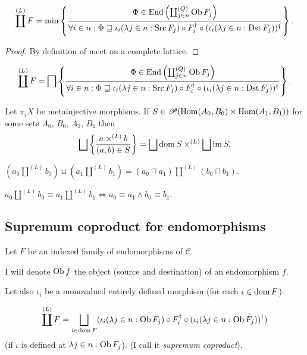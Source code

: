 \begin{prop}
  \[ \coprod^{(L)} F = \min \left\{ \frac{ \Phi \in \operatorname{End} \left( \coprod^{(Q)}_{j
  \in n} \operatorname{Ob} F_j \right) }{ \forall i \in n :
  \Phi \sqsupseteq \iota_i(\lambda j \in n : \operatorname{Src} F_j) \circ
  F_i^{\dagger} \circ (\iota_i(\lambda j \in n : \operatorname{Dst} F_j))^{\dagger} }\right\}. \]
\end{prop}

\begin{proof}
  By definition of meet on a complete lattice.
\end{proof}

\begin{cor}
  \[ \coprod^{(L)} F = \bigsqcap \left\{ \frac{ \Phi \in \operatorname{End} \left(
  \coprod^{(Q)}_{j \in n} \operatorname{Ob} F_j \right) }{
  \forall i \in n : \Phi \sqsupseteq \iota_i(\lambda j \in n : \operatorname{Src}
  F_j) \circ F_i^{\dagger} \circ (\iota_i(\lambda j \in n : \operatorname{Dst}
  F_j))^{\dagger} }\right\}. \]
\end{cor}

\begin{thm}
  Let $\pi_i X$ be metainjective morphisms. If $S \in \mathscr{P} (\operatorname{Hom}
  (A_0 , B_0) \times \operatorname{Hom} (A_1 , B_1))$ for some sets $A_0$, $B_0$,
  $A_1$, $B_1$ then
  \[ \bigsqcup \setcond{ a \times^{(L)} b }{ (a , b)
     \in S } = \bigsqcup \dom S \times^{(L)} \bigsqcup \im
     S. \]
\end{thm}

\begin{cor}
  $(a_0 \amalg^{(L)} b_0) \sqcup (a_1 \amalg^{(L)} b_1) = (a_0 \sqcap a_1)
  \amalg^{(L)} (b_0 \sqcap b_1)$.
\end{cor}

\begin{cor}
  $a_0 \amalg^{(L)} b_0 \equiv a_1 \amalg^{(L)} b_1 \Leftrightarrow a_0 \equiv
  a_1 \wedge b_0 \equiv b_1$.
\end{cor}

\subsection{Supremum coproduct for endomorphisms}

Let $F$ be an indexed family of endomorphisms of $\mathcal{C}$.

I will denote $\operatorname{Ob} f$ the object (source and destination) of an
endomorphism $f$.

Let also $\iota_i$ be a monovalued entirely defined morphism (for each $i \in
\operatorname{dom} F$).

\begin{defn}
  \[ \coprod^{(L)} F = \bigsqcup_{i \in \dom F} (\iota_i(\lambda j \in n :
  \Ob F_j) \circ F_i^{\dagger} \circ (\iota_i(\lambda j \in n :
  \Ob F_j))^{\dagger}) \]
  (if $\iota$ is defined at $\lambda j \in n :
  \operatorname{Ob} F_j$). (I call it \emph{supremum coproduct}).
\end{defn}

